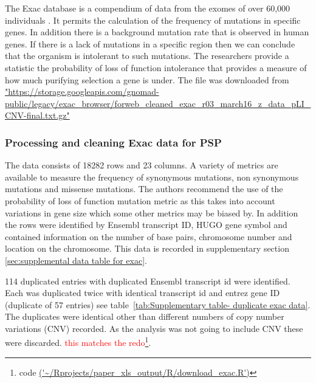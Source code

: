 The Exac database is a compendium of data from the exomes of over 60,000 individuals \cite{lek2016analysis}. It permits the calculation of the frequency of mutations in specific genes. In addition there is a background mutation rate that is observed in human genes. If there is a lack of mutations in a specific region then we can conclude that the organism is intolerant to such mutations. The researchers provide a statistic the probability of loss of function intolerance that provides a measure of how much purifying selection a gene is under. The file was downloaded from 
\url{"https://storage.googleapis.com/gnomad-public/legacy/exac_browser/forweb_cleaned_exac_r03_march16_z_data_pLI_CNV-final.txt.gz"}

\subsubsection{Processing and cleaning Exac data for PSP}
The data consists of 18282 rows and 23 columns. A variety of metrics are available to measure the frequency of synonymous mutations, non synonymous mutations and missense mutations. The authors recommend the use of the probability of loss of function mutation metric as this takes into account variations in gene size which some other metrics may be biased by. In addition the rows were identified by Ensembl transcript ID, HUGO gene symbol and contained information on the number of base pairs, chromosome number and location on the chromosome. This data is recorded in supplementary section~
\ref{sec:supplemental data table for exac}.



114 duplicated entries with duplicated Ensembl transcript id were identified. Each was duplicated twice with identical transcript id and entrez gene ID (duplicate of 57 entries) see table~\ref{tab:Supplementary table- duplicate exac data}. The duplicates were identical other than different numbers of copy number variations (CNV) recorded. As the analysis was not going to include CNV these were discarded.  \textcolor{red}{this matches the redo}\footnote{code \url{('~/Rprojects/paper_xls_output/R/download_exac.R')}}.


